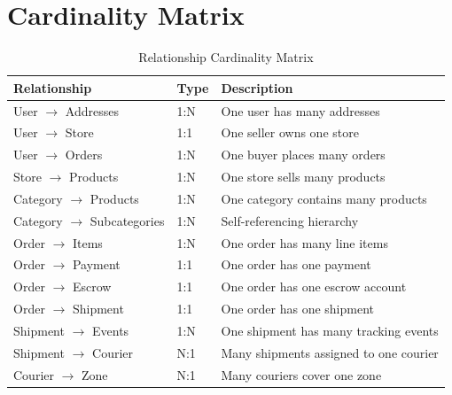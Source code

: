 \documentclass[12pt,a4paper]{report}
\begin{document}
\begin{center}
\end{center}


\section{Cardinality Matrix}

\begin{table}[h]
\centering
\begin{tabular}{lll}
\toprule
\textbf{Relationship} & \textbf{Type} & \textbf{Description} \\
\midrule
User $\rightarrow$ Addresses & 1:N & One user has many addresses \\
User $\rightarrow$ Store & 1:1 & One seller owns one store \\
User $\rightarrow$ Orders & 1:N & One buyer places many orders \\
Store $\rightarrow$ Products & 1:N & One store sells many products \\
Category $\rightarrow$ Products & 1:N & One category contains many products \\
Category $\rightarrow$ Subcategories & 1:N & Self-referencing hierarchy \\
Order $\rightarrow$ Items & 1:N & One order has many line items \\
Order $\rightarrow$ Payment & 1:1 & One order has one payment \\
Order $\rightarrow$ Escrow & 1:1 & One order has one escrow account \\
Order $\rightarrow$ Shipment & 1:1 & One order has one shipment \\
Shipment $\rightarrow$ Events & 1:N & One shipment has many tracking events \\
Shipment $\rightarrow$ Courier & N:1 & Many shipments assigned to one courier \\
Courier $\rightarrow$ Zone & N:1 & Many couriers cover one zone \\
\bottomrule
\end{tabular}
\caption{Relationship Cardinality Matrix}
\end{table}
\end{document}
